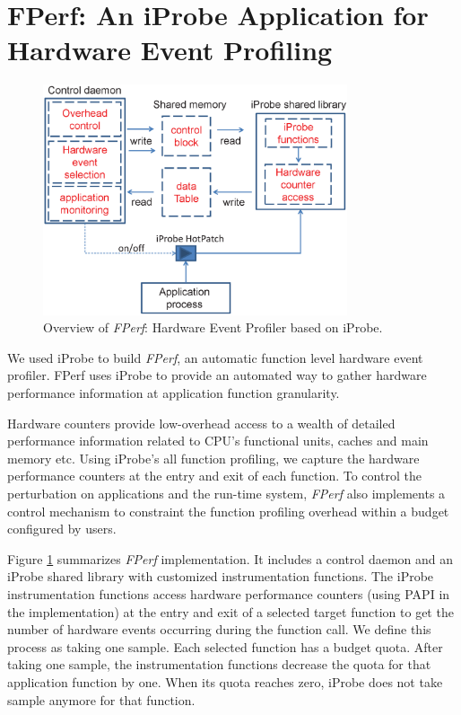 \section{FPerf: An iProbe Application for Hardware Event Profiling}
\label{sec:imp:configure}


\begin{figure}[t]
    \begin{center}
      \includegraphics[width=0.8\textwidth]{iprobe/Images/sysdesign2.eps}
      \caption{Overview of \textit{FPerf}: Hardware Event Profiler based on iProbe.}
      \label{fig:implement}
    \end{center}
\end{figure}

We used iProbe to build \emph{FPerf}, an automatic function level hardware event profiler.  
FPerf uses iProbe to provide an automated way to gather hardware performance information at 
application function granularity.

Hardware counters provide low-overhead access to a wealth of detailed performance information related to CPU's functional units, caches and main memory etc.
Using iProbe's all function profiling, we capture the hardware performance counters at the entry and exit of each function.
To control the perturbation on applications and the run-time system, \textit{FPerf} also implements a control mechanism to constraint the function profiling overhead within a budget configured by users.

Figure \ref{fig:implement} summarizes \textit{FPerf} implementation. 
It includes a control daemon and an iProbe shared library with customized instrumentation functions. 
The iProbe instrumentation functions access hardware performance counters (using PAPI\cite{papi} in the implementation) at the entry and exit of a selected target function to get the number of hardware events occurring during the function call. 
We define this process as taking one sample. 
Each selected function has a budget quota.
After taking one sample, the instrumentation functions decrease the quota for that application function by one. 
When its quota reaches zero, iProbe does not take sample anymore for that function.



